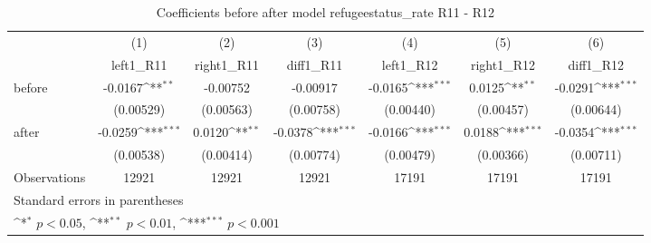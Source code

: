 \begin{table}[!ht]\centering \footnotesize
\def\sym#1{\ifmmode^{#1}\else\(^{#1}\)\fi}
\caption{Coefficients before after model refugeestatus\_rate R11 - R12}
\begin{tabular}{l*{6}{c}}
\hline\hline
                    &\multicolumn{1}{c}{(1)}&\multicolumn{1}{c}{(2)}&\multicolumn{1}{c}{(3)}&\multicolumn{1}{c}{(4)}&\multicolumn{1}{c}{(5)}&\multicolumn{1}{c}{(6)}\\
                    &\multicolumn{1}{c}{left1\_R11}&\multicolumn{1}{c}{right1\_R11}&\multicolumn{1}{c}{diff1\_R11}&\multicolumn{1}{c}{left1\_R12}&\multicolumn{1}{c}{right1\_R12}&\multicolumn{1}{c}{diff1\_R12}\\
\hline
before              &     -0.0167\sym{**} &    -0.00752         &    -0.00917         &     -0.0165\sym{***}&      0.0125\sym{**} &     -0.0291\sym{***}\\
                    &   (0.00529)         &   (0.00563)         &   (0.00758)         &   (0.00440)         &   (0.00457)         &   (0.00644)         \\
[1em]
after               &     -0.0259\sym{***}&      0.0120\sym{**} &     -0.0378\sym{***}&     -0.0166\sym{***}&      0.0188\sym{***}&     -0.0354\sym{***}\\
                    &   (0.00538)         &   (0.00414)         &   (0.00774)         &   (0.00479)         &   (0.00366)         &   (0.00711)         \\
\hline
Observations        &       12921         &       12921         &       12921         &       17191         &       17191         &       17191         \\
\hline\hline
\multicolumn{7}{l}{\footnotesize Standard errors in parentheses}\\
\multicolumn{7}{l}{\footnotesize \sym{*} \(p<0.05\), \sym{**} \(p<0.01\), \sym{***} \(p<0.001\)}\\
\end{tabular}
\end{table}
